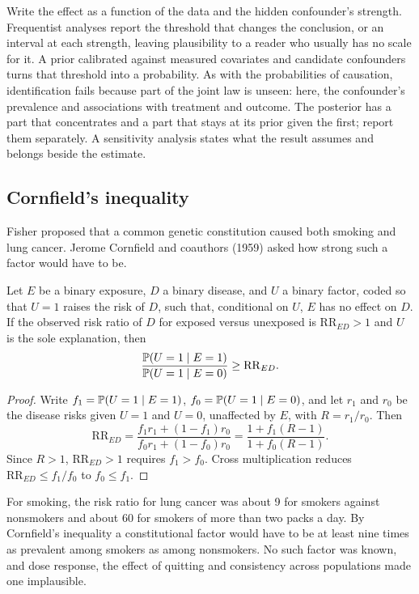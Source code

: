 Write the effect as a function of the data and the hidden confounder's strength. Frequentist analyses report the threshold that changes the conclusion, or an interval at each strength, leaving plausibility to a reader who usually has no scale for it. A prior calibrated against measured covariates and candidate confounders turns that threshold into a probability. As with the probabilities of causation, identification fails because part of the joint law is unseen: here, the confounder's prevalence and associations with treatment and outcome. The posterior has a part that concentrates and a part that stays at its prior given the first; report them separately. A sensitivity analysis states what the result assumes and belongs beside the estimate.

\subsection{Cornfield's inequality}

Fisher proposed that a common genetic constitution caused both smoking and lung cancer. Jerome Cornfield and coauthors (1959) asked how strong such a factor would have to be.

\begin{theorem}[Cornfield]
Let $E$ be a binary exposure, $D$ a binary disease, and $U$ a binary factor, coded so that $U = 1$ raises the risk of $D$, such that, conditional on $U$, $E$ has no effect on $D$. If the observed risk ratio of $D$ for exposed versus unexposed is $\mathrm{RR}_{ED} > 1$ and $U$ is the sole explanation, then
\[
\frac{\mathbb{P}(U = 1 \mid E = 1)}{\mathbb{P}(U = 1 \mid E = 0)} \geq \mathrm{RR}_{ED}.
\]
\end{theorem}

\begin{proof}
Write $f_1 = \mathbb{P}(U=1 \mid E=1)$, $f_0 = \mathbb{P}(U=1 \mid E=0)$, and let $r_1$ and $r_0$ be the disease risks given $U = 1$ and $U = 0$, unaffected by $E$, with $R = r_1/r_0$. Then
\[
\mathrm{RR}_{ED} = \frac{f_1 r_1 + (1 - f_1)r_0}{f_0 r_1 + (1 - f_0)r_0} = \frac{1 + f_1(R - 1)}{1 + f_0(R - 1)}.
\]
Since $R > 1$, $\mathrm{RR}_{ED} > 1$ requires $f_1 > f_0$. Cross multiplication reduces $\mathrm{RR}_{ED} \leq f_1/f_0$ to $f_0 \leq f_1$.
\end{proof}

For smoking, the risk ratio for lung cancer was about 9 for smokers against nonsmokers and about 60 for smokers of more than two packs a day. By Cornfield's inequality a constitutional factor would have to be at least nine times as prevalent among smokers as among nonsmokers. No such factor was known, and dose response, the effect of quitting and consistency across populations made one implausible.

